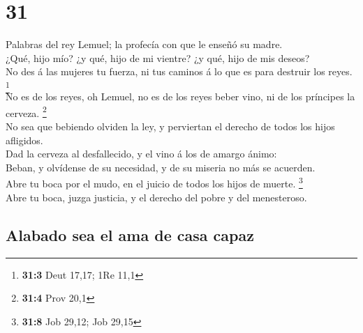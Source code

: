 \hypertarget{section-30}{%
\section{31}\label{section-30}}

 Palabras del rey Lemuel; la profecía con que le enseñó su
madre.\\
 ¿Qué, hijo mío? ¿y qué, hijo de mi vientre? ¿y qué, hijo de
mis deseos?\\
 No des á las mujeres tu fuerza, ni tus caminos á lo que es
para destruir los reyes. \footnote{\textbf{31:3} Deut 17,17; 1Re 11,1}\\
 No es de los reyes, oh Lemuel, no es de los reyes beber
vino, ni de los príncipes la cerveza. \footnote{\textbf{31:4} Prov 20,1}\\
 No sea que bebiendo olviden la ley, y perviertan el derecho
de todos los hijos afligidos.\\
 Dad la cerveza al desfallecido, y el vino á los de amargo
ánimo:\\
 Beban, y olvídense de su necesidad, y de su miseria no más
se acuerden.\\
 Abre tu boca por el mudo, en el juicio de todos los hijos
de muerte. \footnote{\textbf{31:8} Job 29,12; Job 29,15}\\
 Abre tu boca, juzga justicia, y el derecho del pobre y del
menesteroso.

\hypertarget{alabado-sea-el-ama-de-casa-capaz}{%
\subsection{Alabado sea el ama de casa
capaz}\label{alabado-sea-el-ama-de-casa-capaz}}

